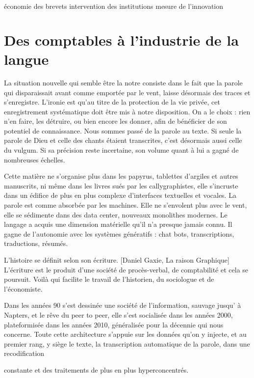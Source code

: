 \documentclass[
  letterpaper,
  DIV=11,
  numbers=noendperiod]{scrreprt}
\begin{document}
économie des brevets intervention des institutions mesure de
l'innovation


\chapter{Des comptables à l'industrie de la
langue}\label{des-comptables-uxe0-lindustrie-de-la-langue}

La situation nouvelle qui semble être la notre consiste dans le fait que
la parole qui disparaissait avant comme emportée par le vent, laisse
désormais des traces et s'enregistre. L'ironie est qu'au titre de la
protection de la vie privée, cet enregistrement systématique doit être
mis à notre disposition. On a le choix : rien n'en faire, les détruire,
ou bien encore les donner, afin de bénéficier de son potentiel de
connaissance. Nous sommes passé de la parole au texte. Si seule la
parole de Dieu et celle des chants étaient transcrites, c'est désormais
aussi celle du vulgum. Si sa précision reste incertaine, son volume
quant à lui a gagné de nombreuses échelles.

Cette matière ne s'organise plus dans les papyrus, tablettes d'argiles
et autres manuscrits, ni même dans les livres sués par les
callygraphistes, elle s'incruste dans un édifice de plus en plus
complexe d'interfaces textuelles et vocales. La parole est comme
absorbée par les machines. Elle ne s'envolent plus avec le vent, elle se
sédimente dans des data center, nouveaux monolithes modernes. Le langage
a acquis une dimension matérielle qu'il n'a presque jamais connu. Il
gagne de l'autonomie avec les systèmes génératifs : chat bots,
transcriptions, traductions, résumés.

L'histoire se définit selon son écriture. {[}Daniel Gaxie, La raison
Graphique{]} L'écriture est le produit d'une société de procès-verbal,
de comptabilité et cela se poursuit. Voilà qui facilite le travail de
l'historien, du sociologue et de l'économiste.

Dans les années 90 s'est dessinée une société de l'information, sauvage
jusqu' à Napters, et le rêve du peer to peer, elle s'est socialisée dans
les années 2000, plateformisée dans les années 2010, généralisée pour la
décennie qui nous concerne. Toute cette architecture s'appuie sur les
données qu'on y injecte, et au premier rang, y siège le texte, la
transcription automatique de la parole, dans une recodification

constante et des traitements de plus en plus hyperconcentrés.
\end{document}
